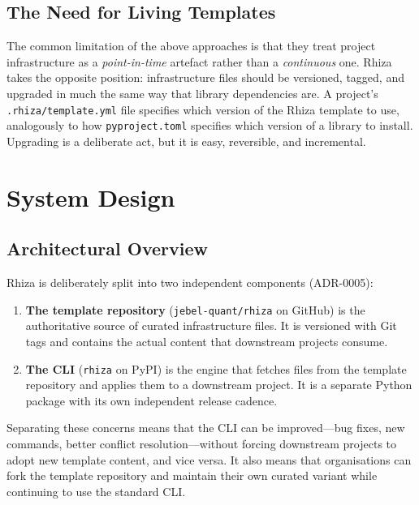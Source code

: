 \documentclass[12pt,a4paper]{article}
\begin{document}
\subsection{The Need for Living Templates}

The common limitation of the above approaches is that they treat project infrastructure as a \emph{point-in-time} artefact rather than a \emph{continuous} one. Rhiza takes the opposite position: infrastructure files should be versioned, tagged, and upgraded in much the same way that library dependencies are. A project's \texttt{.rhiza/template.yml} file specifies which version of the Rhiza template to use, analogously to how \texttt{pyproject.toml} specifies which version of a library to install. Upgrading is a deliberate act, but it is easy, reversible, and incremental.

\section{System Design}
\label{sec:design}

\subsection{Architectural Overview}

Rhiza is deliberately split into two independent components (ADR-0005):

\begin{enumerate}[leftmargin=*]
  \item \textbf{The template repository} (\texttt{jebel-quant/rhiza} on GitHub) is the authoritative source of curated infrastructure files. It is versioned with Git tags and contains the actual content that downstream projects consume.

  \item \textbf{The CLI} (\texttt{rhiza} on PyPI) is the engine that fetches files from the template repository and applies them to a downstream project. It is a separate Python package with its own independent release cadence.
\end{enumerate}

Separating these concerns means that the CLI can be improved---bug fixes, new commands, better conflict resolution---without forcing downstream projects to adopt new template content, and vice versa. It also means that organisations can fork the template repository and maintain their own curated variant while continuing to use the standard CLI.
\end{document}
